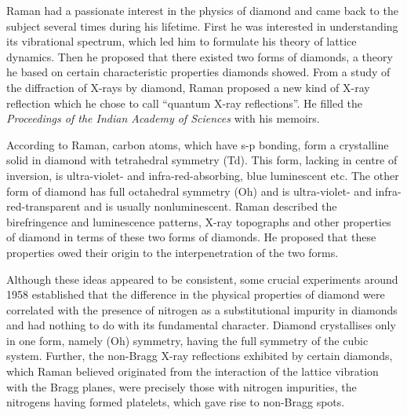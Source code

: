 \newpage

\smallskip



\noindent
Raman had a passionate interest in the physics of diamond
and came back to the subject several times during his lifetime.
First he was interested in understanding its vibrational spectrum,
which led him to formulate his theory of lattice dynamics. Then
he proposed that there existed two forms of diamonds, a theory
he based on certain characteristic properties diamonds showed.
From a study of the diffraction of X-rays by diamond, Raman
proposed a new kind of X-ray reflection which he chose to call
``quantum X-ray reflections''. He filled the {\em Proceedings of the
Indian Academy of Sciences} with his memoirs.

According to Raman, carbon atoms, which have s-p
bonding, form a crystalline solid in diamond with tetrahedral
symmetry (Td). This form, lacking in centre of inversion, is ultra-violet- and infra-red-absorbing, blue luminescent etc. The other
form of diamond has full octahedral symmetry (Oh) and is ultra-violet- and infra-red-transparent and is usually nonluminescent.
Raman described the birefringence and luminescence patterns,
X-ray topographs and other properties of diamond in terms of
these two forms of diamonds. He proposed that these properties
owed their origin to the interpenetration of the two forms.

Although these ideas appeared to be consistent, some crucial
experiments around 1958 established that the difference in the
physical properties of diamond were correlated with the presence
of nitrogen as a substitutional impurity in diamonds and had
nothing to do with its fundamental character. Diamond
crystallises only in one form, namely (Oh) symmetry, having the
full symmetry of the cubic system. Further, the non-Bragg X-ray
reflections exhibited by certain diamonds, which Raman believed
originated from the interaction of the lattice vibration with
the Bragg planes, were precisely those with nitrogen impurities,
the nitrogens having formed platelets, which gave rise to
non-Bragg spots.

